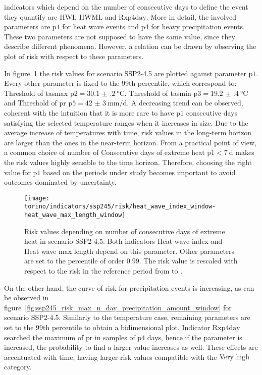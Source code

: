 \Glspl{indicator} which depend on the number of consecutive days to define the event they quantify are $\mathrm{HWI}$, $\mathrm{HWML}$ and $\mathrm{Rxp4day}$. More in detail, the involved parameters are $\mathrm{p1}$ for heat wave events and $\mathrm{p4}$ for heavy precipitation events. These two parameters are not supposed to have the same value, since they describe different phenomena. However, a relation can be drawn by observing the plot of risk with respect to these parameters.

In figure~\ref{fig:ssp245_risk_heat_wave_index_window-heat_wave_max_length_window} the risk values for scenario SSP2-4.5 are plotted against parameter $\mathrm{p1}$. Every other parameter is fixed to the 99th percentile, which correspond to: {Threshold of \gls{tasmax}} $\mathrm{p2} = \qty{30.1(2)}{\degreeCelsius}$, {Threshold of \gls{tasmin}} $\mathrm{p3} = \qty{19.2(4)}{\degreeCelsius}$ and {Threshold of \gls{pr}} $\mathrm{p5} = \qty{42(3)}{\milli\metre\per\day}$. A decreasing trend can be observed, coherent with the intuition that it is more rare to have $\mathrm{p1}$ consecutive days satisfying the selected temperature ranges when it increases in size. Due to the average increase of temperatures with time, risk values in the long-term horizon are larger than the ones in the near-term horizon.
From a practical point of view, a common choice of number of {Consecutive days of extreme heat} $\mathrm{p1} < \qty{7}{\day}$ makes the risk values highly sensible to the time horizon. Therefore, choosing the right value for $\mathrm{p1}$ based on the periods under study becomes important to avoid outcomes dominated by uncertainty.

\begin{figure}
  \centering
  \texttt{[image: torino/indicators/ssp245/risk/heat\_wave\_index\_window-heat\_wave\_max\_length\_window]}
  \caption{Risk values depending on number of consecutive days of extreme heat in scenario SSP2-4.5. Both indicators {Heat wave index} and {Heat wave max length} depend on this parameter. Other parameters are set to the percentile of order 0.99. The risk value is rescaled with respect to the risk in the reference period from  to .}
  \label{fig:ssp245_risk_heat_wave_index_window-heat_wave_max_length_window}
\end{figure}

On the other hand, the curve of risk for precipitation events is increasing, as can be observed in figure~\ref{fig:ssp245_risk_max_n_day_precipitation_amount_window} for scenario SSP2-4.5. Similarly to the temperature case, remaining parameters are set to the 99th percentile to obtain a bidimensional plot. Indicator $\mathrm{Rxp4day}$ searched the maximum of \gls{pr} in samples of $\mathrm{p4}$ days, hence if the parameter is increased, the probability to find a larger value increases as well. These effects are accentuated with time, having larger risk values compatible with the $\text{Very high}$ category.


